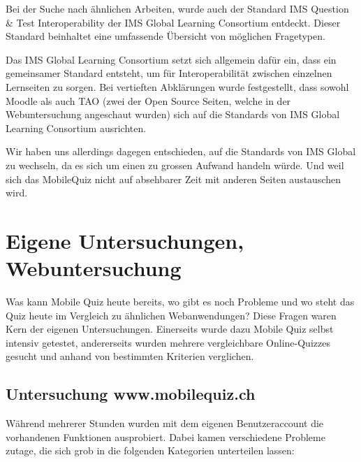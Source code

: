 Bei der Suche nach ähnlichen Arbeiten, wurde auch der Standard \glqq IMS Question \& Test Interoperability\grqq \cite{imsglobal.org} der IMS Global Learning Consortium entdeckt. Dieser Standard beinhaltet eine umfassende Übersicht von möglichen Fragetypen.

Das IMS Global Learning Consortium setzt sich allgemein dafür ein, dass ein gemeinsamer Standard entsteht, um für Interoperabilität zwischen einzelnen Lernseiten zu sorgen. Bei vertieften Abklärungen wurde festgestellt, dass sowohl Moodle als auch TAO (zwei der Open Source Seiten, welche in der Webuntersuchung angeschaut wurden) sich auf die Standards von IMS Global Learning Consortium ausrichten.

Wir haben uns allerdings dagegen entschieden, auf die Standards von IMS Global zu wechseln, da es sich um einen zu grossen Aufwand handeln würde. Und weil sich das MobileQuiz nicht auf absehbarer Zeit mit anderen Seiten austauschen wird.


\section{Eigene Untersuchungen, Webuntersuchung}

Was kann Mobile Quiz heute bereits, wo gibt es noch Probleme und wo steht das Quiz heute im Vergleich zu ähnlichen Webanwendungen? Diese Fragen waren Kern der eigenen Untersuchungen. Einerseits wurde dazu Mobile Quiz selbst intensiv getestet, andererseits wurden mehrere vergleichbare Online-Quizzes gesucht und anhand von bestimmten Kriterien verglichen.


	\subsection{Untersuchung www.mobilequiz.ch}
	Während mehrerer Stunden wurden mit dem eigenen Benutzeraccount die vorhandenen Funktionen ausprobiert. Dabei kamen verschiedene Probleme zutage, die sich grob in die folgenden Kategorien unterteilen lassen:
	

